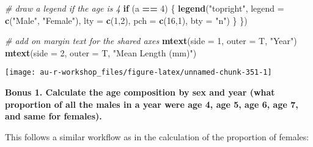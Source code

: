 \documentclass[]{book}
\newenvironment{Shaded}{\begin{snugshade}}{\end{snugshade}}
\newcommand{\KeywordTok}[1]{\textcolor[rgb]{0.13,0.29,0.53}{\textbf{#1}}}
\newcommand{\DataTypeTok}[1]{\textcolor[rgb]{0.13,0.29,0.53}{#1}}
\newcommand{\DecValTok}[1]{\textcolor[rgb]{0.00,0.00,0.81}{#1}}
\newcommand{\StringTok}[1]{\textcolor[rgb]{0.31,0.60,0.02}{#1}}
\newcommand{\CommentTok}[1]{\textcolor[rgb]{0.56,0.35,0.01}{\textit{#1}}}
\newcommand{\ControlFlowTok}[1]{\textcolor[rgb]{0.13,0.29,0.53}{\textbf{#1}}}
\newcommand{\OperatorTok}[1]{\textcolor[rgb]{0.81,0.36,0.00}{\textbf{#1}}}
\newcommand{\NormalTok}[1]{#1}
\theoremstyle{definition}
\theoremstyle{definition}
\theoremstyle{definition}
\theoremstyle{remark}
\begin{document}
\begin{Shaded}
\begin{Highlighting}[]
  \CommentTok{# draw a legend if the age is 4}
  \ControlFlowTok{if}\NormalTok{ (a }\OperatorTok{==}\StringTok{ }\DecValTok{4}\NormalTok{) \{}
    \KeywordTok{legend}\NormalTok{(}\StringTok{"topright"}\NormalTok{, }\DataTypeTok{legend =} \KeywordTok{c}\NormalTok{(}\StringTok{"Male"}\NormalTok{, }\StringTok{"Female"}\NormalTok{),}
           \DataTypeTok{lty =} \KeywordTok{c}\NormalTok{(}\DecValTok{1}\NormalTok{,}\DecValTok{2}\NormalTok{), }\DataTypeTok{pch =} \KeywordTok{c}\NormalTok{(}\DecValTok{16}\NormalTok{,}\DecValTok{1}\NormalTok{), }\DataTypeTok{bty =} \StringTok{"n"}\NormalTok{)}
\NormalTok{  \}}
\NormalTok{\})}

\CommentTok{# add on margin text for the shared axes}
\KeywordTok{mtext}\NormalTok{(}\DataTypeTok{side =} \DecValTok{1}\NormalTok{, }\DataTypeTok{outer =}\NormalTok{ T, }\StringTok{"Year"}\NormalTok{)}
\KeywordTok{mtext}\NormalTok{(}\DataTypeTok{side =} \DecValTok{2}\NormalTok{, }\DataTypeTok{outer =}\NormalTok{ T, }\StringTok{"Mean Length (mm)"}\NormalTok{)}
\end{Highlighting}
\end{Shaded}

\begin{center}\texttt{[image: au-r-workshop\_files/figure-latex/unnamed-chunk-351-1]} \end{center}

\textbf{Bonus 1. Calculate the age composition by sex and year (what
proportion of all the males in a year were age 4, age 5, age 6, age 7,
and same for females).}

This follows a similar workflow as in the calculation of the proportion
of females:

\begin{Shaded}
\end{Shaded}
\end{document}

